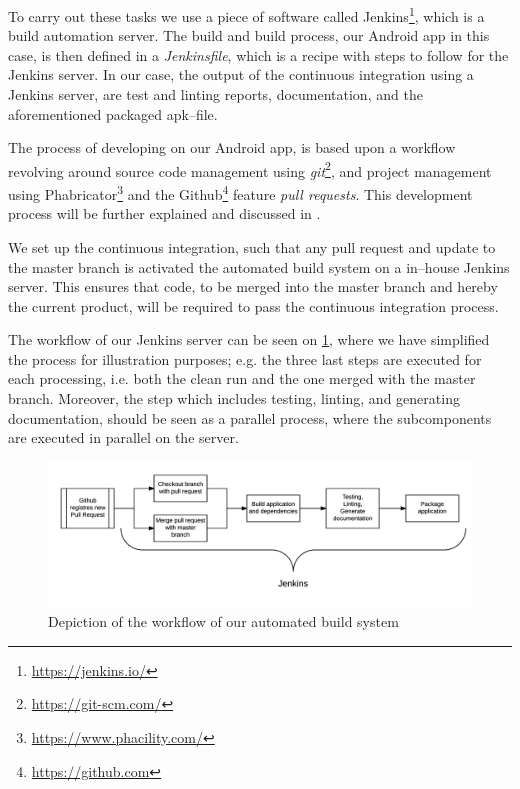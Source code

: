 To carry out these tasks we use a piece of software called Jenkins\footnote{\url{https://jenkins.io/}}, which is a build automation server.
The build and build process, our Android app in this case, is then defined in a \textit{Jenkinsfile}, which is a recipe with steps to follow for the Jenkins server.
In our case, the output of the continuous integration using a Jenkins server, are test and linting reports, documentation, and the aforementioned packaged apk--file.

The process of developing on our Android app, is based upon a workflow revolving around source code management using \textit{git}\footnote{\url{https://git-scm.com/}}, and project management using Phabricator\footnote{\url{https://www.phacility.com/}} and the Github\footnote{\url{https://github.com}} feature \textit{pull requests}.
This development process will be further explained and discussed in .

We set up the continuous integration, such that any pull request and update to the master branch is activated the automated build system on a in--house Jenkins server.
This ensures that code, to be merged into the master branch and hereby the current product, will be required to pass the continuous integration process.

The workflow of our Jenkins server can be seen on \cref{fig:jenkins_workflow}, where we have simplified the process for illustration purposes; e.g. the three last steps are executed for each processing, i.e. both the clean run and the one merged with the master branch.
Moreover, the step which includes testing, linting, and generating documentation, should be seen as a parallel process, where the subcomponents are executed in parallel on the server.

\begin{figure}[tb]
    \includegraphics[width=1\textwidth]{./jenkins_workflow.png}
    \caption{Depiction of the workflow of our automated build system}\label{fig:jenkins_workflow}
\end{figure}

